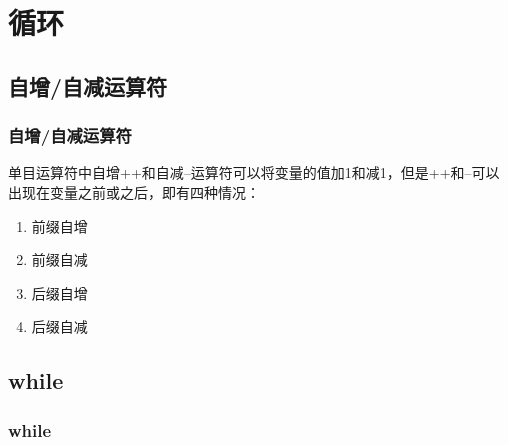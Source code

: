 \chapter{循环}

\section{自增/自减运算符}

\subsection{自增/自减运算符}

单目运算符中自增++和自减--运算符可以将变量的值加1和减1，但是++和--可以出现在变量之前或之后，即有四种情况：

\begin{enumerate}
    \item 前缀自增
    \item 前缀自减
    \item 后缀自增
    \item 后缀自减
\end{enumerate}

\begin{table}[H]
    \centering
    \caption{自增/自减运算符}
\end{table}

\newpage

\section{while}

\subsection{while}

